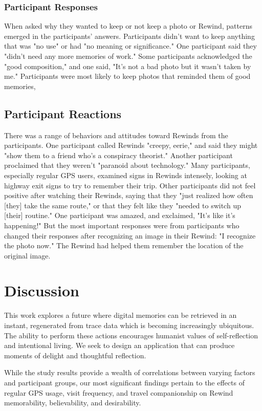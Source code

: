 \documentclass{sigchi}
\begin{document}
\subsubsection{Participant Responses}
When asked why they wanted to keep or not keep a photo or Rewind, patterns emerged in the participants' answers. Participants didn't want to keep anything that was "no use" or had "no meaning or significance." One participant said they "didn't need any more memories of work." Some participants acknowledged the "good composition," and one said, "It's not a bad photo but it wasn't taken by me." Participants were most likely to keep photos that reminded them of good memories, 

\subsection{Participant Reactions}
There was a range of behaviors and attitudes toward Rewinds from the participants. One participant called Rewinds "creepy, eerie," and said they might "show them to a friend who's a conspiracy theorist." Another participant proclaimed that they weren't "paranoid about technology." Many participants, especially regular GPS users, examined signs in Rewinds intensely, looking at highway exit signs to try to remember their trip. Other participants did not feel positive after watching their Rewinds, saying that they "just realized how often [they] take the same route," or that they felt like they "needed to switch up [their] routine." One participant was amazed, and exclaimed, "It's like it's happening!" But the most important responses were from participants who changed their responses after recognizing an image in their Rewind: "I recognize the photo now." The Rewind had helped them remember the location of the original image.

\section{Discussion}
This work explores a future where digital memories can be retrieved in an instant, regenerated from trace data which is becoming increasingly ubiquitous. The ability to perform these actions encourages humanist values of self-reflection and intentional living. We seek to design an application that can produce moments of delight and thoughtful reflection.

While the study results provide a wealth of correlations between varying factors and participant groups, our most significant findings pertain to the effects of regular GPS usage, visit frequency, and travel companionship on Rewind memorability, believability, and desirability. 
\end{document}
